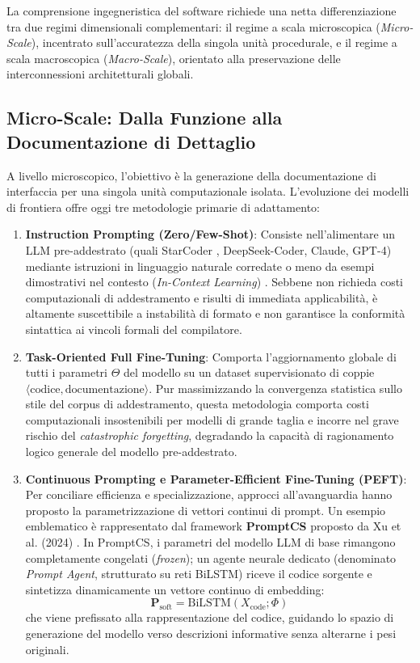 La comprensione ingegneristica del software richiede una netta differenziazione tra due regimi dimensionali complementari: il regime a scala microscopica (\emph{Micro-Scale}), incentrato sull'accuratezza della singola unità procedurale, e il regime a scala macroscopica (\emph{Macro-Scale}), orientato alla preservazione delle interconnessioni architetturali globali.

\subsection{Micro-Scale: Dalla Funzione alla Documentazione di Dettaglio}
\label{subsec:micro_scale}
A livello microscopico, l'obiettivo è la generazione della documentazione di interfaccia per una singola unità computazionale isolata. L'evoluzione dei modelli di frontiera offre oggi tre metodologie primarie di adattamento:
\begin{enumerate}
    \item \textbf{Instruction Prompting (Zero/Few-Shot)}: Consiste nell'alimentare un LLM pre-addestrato (quali StarCoder \cite{xu_prompt_2024}, DeepSeek-Coder, Claude, GPT-4) mediante istruzioni in linguaggio naturale corredate o meno da esempi dimostrativi nel contesto (\emph{In-Context Learning}) \cite{geng_large_2023}. Sebbene non richieda costi computazionali di addestramento e risulti di immediata applicabilità, è altamente suscettibile a instabilità di formato e non garantisce la conformità sintattica ai vincoli formali del compilatore.
    \item \textbf{Task-Oriented Full Fine-Tuning}: Comporta l'aggiornamento globale di tutti i parametri $\Theta$ del modello su un dataset supervisionato di coppie $\langle\text{codice}, \text{documentazione}\rangle$. Pur massimizzando la convergenza statistica sullo stile del corpus di addestramento, questa metodologia comporta costi computazionali insostenibili per modelli di grande taglia e incorre nel grave rischio del \emph{catastrophic forgetting}, degradando la capacità di ragionamento logico generale del modello pre-addestrato.
    \item \textbf{Continuous Prompting e Parameter-Efficient Fine-Tuning (PEFT)}: Per conciliare efficienza e specializzazione, approcci all'avanguardia hanno proposto la parametrizzazione di vettori continui di prompt. Un esempio emblematico è rappresentato dal framework \textbf{PromptCS} proposto da Xu et al. (2024) \cite{xu_prompt_2024}. In PromptCS, i parametri del modello LLM di base rimangono completamente congelati (\emph{frozen}); un agente neurale dedicato (denominato \emph{Prompt Agent}, strutturato su reti BiLSTM) riceve il codice sorgente e sintetizza dinamicamente un vettore continuo di embedding:
    \begin{equation}
        \mathbf{P}_{\mathrm{soft}} = \mathrm{BiLSTM}(X_{\mathrm{code}}; \Phi)
        \label{eq:promptcs_soft}
    \end{equation}
    che viene prefissato alla rappresentazione del codice, guidando lo spazio di generazione del modello verso descrizioni informative senza alterarne i pesi originali.
\end{enumerate}

